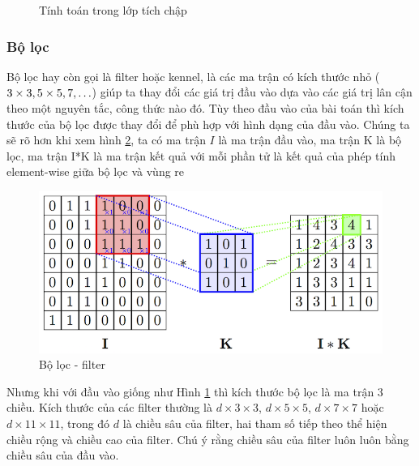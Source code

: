 \begin{figure}[H]
\hfill
{}
\caption{Tính toán trong lớp tích chập}
\label{fig:tinhtoanConv}
\end{figure}
\subsubsection{Bộ lọc}
  Bộ lọc hay còn gọi là filter hoặc kennel, là các ma trận có kích thước nhỏ ($3\times 3, 5\times 5, 7\time7, \ldots$) giúp ta thay đổi các giá trị đầu vào dựa vào các giá trị lân cận theo một nguyên tắc, công thức nào đó. Tùy theo đầu vào của bài toán thì kích thước của bộ lọc được thay đổi để phù hợp với hình dạng của đầu vào. Chúng ta sẽ rõ hơn khi xem hình \ref{fig:filter}, ta có ma trận $I$ là ma trận đầu vào, ma trận K là bộ lọc, ma trận I*K là ma trận kết quả với mỗi phần tử là kết quả của phép tính element-wise giữa bộ lọc và vùng re
\begin{center}
\begin{figure}[htp]
	\begin{center}
		\includegraphics[scale=1.2]{chap3/image/cnn/minhHoaTichChap.png}
	\end{center}
	\caption{Bộ lọc - filter}
	\label{fig:filter}
\end{figure}
\end{center}
Nhưng khi với đầu vào giống như Hình \ref{fig:tinhtoanConv} thì kích thước bộ lọc là ma trận 3 chiều.
  Kích thước của các filter thường là $d\times3\times3$, $d\times5\times5$, $d\times7\times7$  hoặc $d\times11\times11$, trong đó $d$ là chiều sâu của filter, hai tham số tiếp theo thể hiện chiều rộng và chiều cao của filter. Chú ý rằng chiều sâu của filter luôn luôn bằng chiều sâu của đầu vào.
